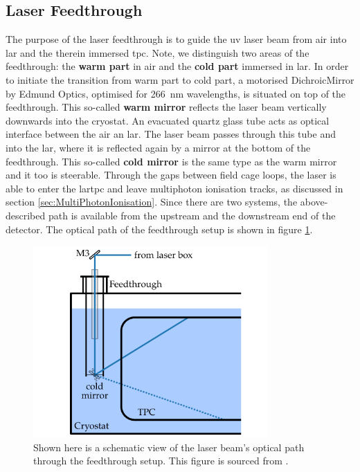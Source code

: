 \subsection{Laser Feedthrough} \label{sec:LaserFeedthrough}
The purpose of the laser feedthrough is to guide the \gls{uv} laser beam from air into \gls{lar} and the therein immersed \gls{tpc}. Note, we distinguish two areas of the feedthrough: the \textbf{warm part} in air and the \textbf{cold part} immersed in \gls{lar}. In order to initiate the transition from warm part to cold part, a motorised \gls{DichroicMirror} by Edmund Optics, optimised for \SI{266}{\nano\metre} wavelengths, is situated on top of the feedthrough. This so-called \textbf{warm mirror} reflects the laser beam vertically downwards into the cryostat. An evacuated quartz glass tube acts as optical interface between the air an \gls{lar}. The laser beam passes through this tube and into the \gls{lar}, where it is reflected again by a mirror at the bottom of the feedthrough. This so-called \textbf{cold mirror} is the same type as the warm mirror and it too is steerable. Through the gaps between field cage loops, the laser is able to enter the \gls{lartpc} and leave multiphoton ionisation tracks, as discussed in section \ref{sec:MultiPhotonIonisation}. Since there are two systems, the above-described path is available from the upstream and the downstream end of the detector. The optical path of the feedthrough setup is shown in figure \ref{fig:FeedthroughOptics}. 
\begin{figure}[htbp]
    \centering
    \includegraphics[width=0.8\textwidth]{images/MicroBooNE/LCSFeedthroughOptics.pdf}     
    \caption[LCS Feedthrough Schematics]{Shown here is a schematic view of the laser beam's optical path through the feedthrough setup. This figure is sourced from \cite{LArLaserPhDMatthias}.}
    \label{fig:FeedthroughOptics}
\end{figure}
